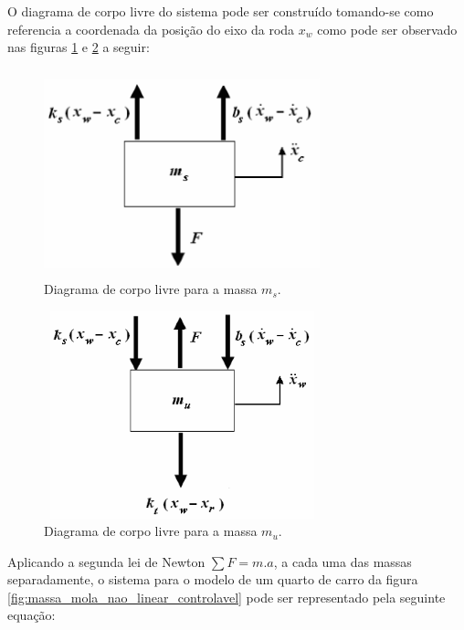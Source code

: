 O diagrama de corpo livre do sistema pode ser construído tomando-se como referencia a coordenada da posição do eixo da roda $x_w$ como pode ser observado nas figuras \ref{fig:corpo_livre_ms} e \ref{fig:corpo_livre_mu} a seguir:
\FloatBarrier
\begin{figure}[htbp]
        \begin{centering}
            \includegraphics[width=8cm,height=6cm]{img/corpo_livre_ms.png}
            \caption{Diagrama de corpo livre para a massa $m_s$.} 
            \label{fig:corpo_livre_ms}
        \end{centering}
\end{figure}
\FloatBarrier
\begin{figure}[htbp]
    \begin{centering}
        \includegraphics[width=8cm,height=6cm]{img/corpo_livre_mu.png}
        \caption{Diagrama de corpo livre para a massa $m_u$.} 
        \label{fig:corpo_livre_mu}
    \end{centering}
\end{figure}
\FloatBarrier
    
Aplicando a segunda lei de Newton $\sum{F}=m.a$, a cada uma das massas separadamente, o sistema para o modelo de um quarto de carro da figura \ref{fig:massa_mola_nao_linear_controlavel} pode ser representado pela seguinte equação:
    
